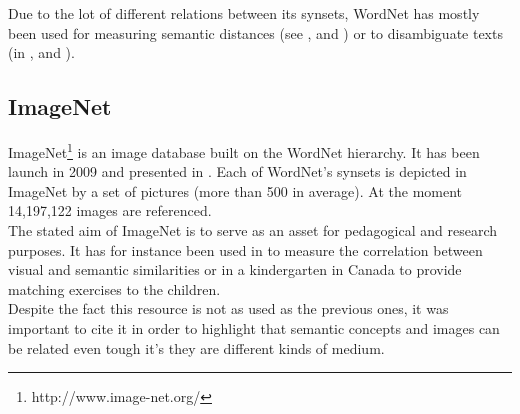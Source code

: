 Due to the lot of different relations between its synsets, WordNet has mostly been used for measuring semantic distances (see \cite{budanitsky2001semantic}, \cite{richardson1994using} and \cite{agirre2009study}) or to disambiguate texts (in \cite{resnik1995disambiguating}, \cite{voorhees1993using} and \cite{banerjee2002adapted}).\\

\subsection{ImageNet} %
\label{sub:imagenet}

ImageNet\footnote{http://www.image-net.org/} is an image database built on the WordNet hierarchy. It has been launch in 2009 and presented in \cite{deng2009imagenet}. Each of WordNet's synsets is depicted in ImageNet by a set of pictures (more than 500 in average). At the moment 14,197,122 images are referenced.\\

The stated aim of ImageNet is to serve as an asset for pedagogical and research purposes. It has for instance been used in \cite{deselaers2011visual} to measure the correlation between visual and semantic similarities or in a kindergarten in Canada to provide matching exercises to the children.\\

Despite the fact this resource is not as used as the previous ones, it was important to cite it in order to highlight that semantic concepts and images can be related even tough it's they are different kinds of medium.  


